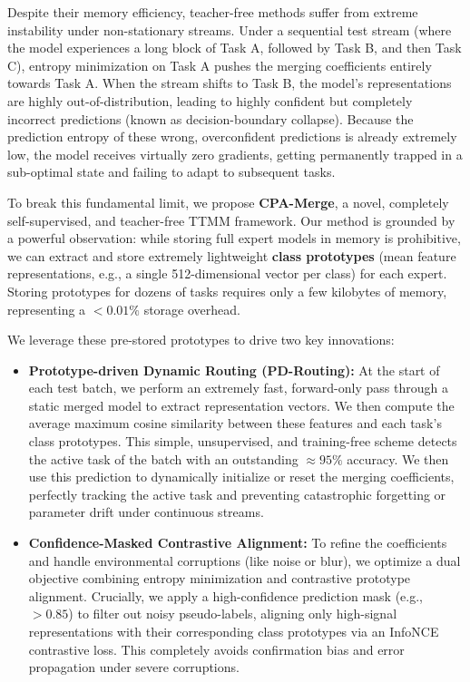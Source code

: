 \documentclass{article}
\theoremstyle{plain}
\theoremstyle{definition}
\theoremstyle{remark}
\begin{document}
Despite their memory efficiency, teacher-free methods suffer from extreme instability under non-stationary streams. Under a sequential test stream (where the model experiences a long block of Task A, followed by Task B, and then Task C), entropy minimization on Task A pushes the merging coefficients entirely towards Task A. When the stream shifts to Task B, the model's representations are highly out-of-distribution, leading to highly confident but completely incorrect predictions (known as decision-boundary collapse). Because the prediction entropy of these wrong, overconfident predictions is already extremely low, the model receives virtually zero gradients, getting permanently trapped in a sub-optimal state and failing to adapt to subsequent tasks.

To break this fundamental limit, we propose \textbf{CPA-Merge}, a novel, completely self-supervised, and teacher-free TTMM framework. Our method is grounded by a powerful observation: while storing full expert models in memory is prohibitive, we can extract and store extremely lightweight \textbf{class prototypes} (mean feature representations, e.g., a single 512-dimensional vector per class) for each expert. Storing prototypes for dozens of tasks requires only a few kilobytes of memory, representing a $<0.01\%$ storage overhead.

We leverage these pre-stored prototypes to drive two key innovations:
\begin{itemize}
    \item \textbf{Prototype-driven Dynamic Routing (PD-Routing):} At the start of each test batch, we perform an extremely fast, forward-only pass through a static merged model to extract representation vectors. We then compute the average maximum cosine similarity between these features and each task's class prototypes. This simple, unsupervised, and training-free scheme detects the active task of the batch with an outstanding $\approx 95\%$ accuracy. We then use this prediction to dynamically initialize or reset the merging coefficients, perfectly tracking the active task and preventing catastrophic forgetting or parameter drift under continuous streams.
    \item \textbf{Confidence-Masked Contrastive Alignment:} To refine the coefficients and handle environmental corruptions (like noise or blur), we optimize a dual objective combining entropy minimization and contrastive prototype alignment. Crucially, we apply a high-confidence prediction mask (e.g., $>0.85$) to filter out noisy pseudo-labels, aligning only high-signal representations with their corresponding class prototypes via an InfoNCE contrastive loss. This completely avoids confirmation bias and error propagation under severe corruptions.
\end{itemize}
\end{document}

